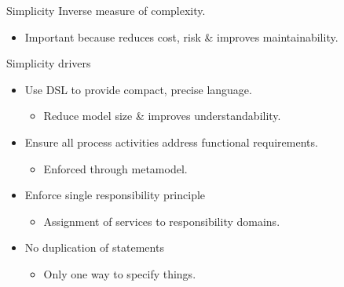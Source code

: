 \begin{frame}{Simplicity}
  Inverse measure of complexity.
		\begin{itemize} 
			 \item Important because reduces cost, risk \& improves maintainability.
		  \end{itemize}
  \pause
  \begin{block}{Simplicity drivers}
	 \begin{itemize}
		\item<+-| alert@+> Use DSL to provide compact, precise language.
		  \begin{itemize}
			 \item Reduce model size \& improves understandability.
		  \end{itemize}
		\item<+-| alert@+> Ensure all process activities address functional requirements.
		  \begin{itemize}
			 \item Enforced through metamodel.
		  \end{itemize}
		\item<+-| alert@+> Enforce single responsibility principle
			 \begin{itemize}
				\item Assignment of services to responsibility domains.
			 \end{itemize}
	 \item<+-| alert@+> No duplication of statements
		  \begin{itemize}
			 \item Only one way to specify things.
		  \end{itemize}
	 \end{itemize}
  \end{block}
\end{frame}


